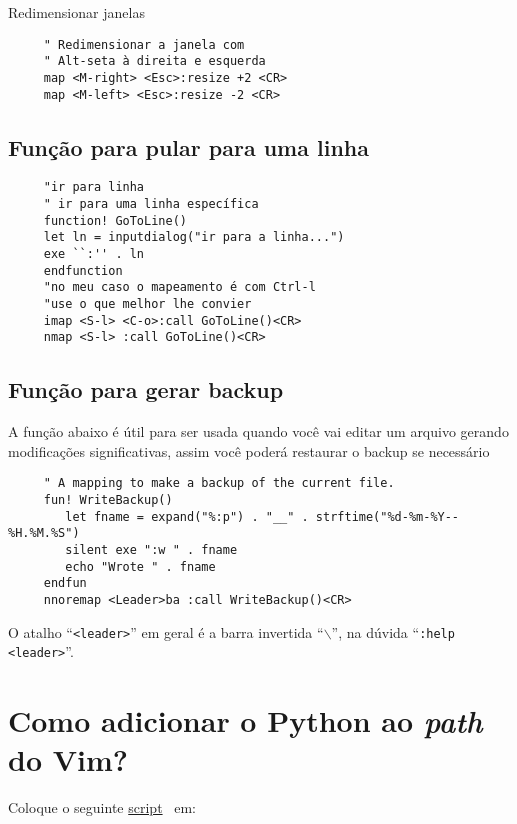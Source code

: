 Redimensionar janelas

\begin{verbatim}
     " Redimensionar a janela com
     " Alt-seta à direita e esquerda
     map <M-right> <Esc>:resize +2 <CR>
     map <M-left> <Esc>:resize -2 <CR>
\end{verbatim}

\subsection{Função para pular para uma linha}
\label{Função para pular para uma linha}

\begin{verbatim}
     "ir para linha
     " ir para uma linha específica
     function! GoToLine()
     let ln = inputdialog("ir para a linha...")
     exe ``:'' . ln
     endfunction
     "no meu caso o mapeamento é com Ctrl-l
     "use o que melhor lhe convier
     imap <S-l> <C-o>:call GoToLine()<CR>
     nmap <S-l> :call GoToLine()<CR>
\end{verbatim}

\subsection{Função para gerar backup}
\label{Função para gerar backup}

A função abaixo é útil para ser usada quando você vai editar um arquivo
gerando modificações significativas, assim você poderá restaurar o backup se necessário

\begin{verbatim}
     " A mapping to make a backup of the current file.
     fun! WriteBackup()
        let fname = expand("%:p") . "__" . strftime("%d-%m-%Y--%H.%M.%S")
        silent exe ":w " . fname
        echo "Wrote " . fname
     endfun
     nnoremap <Leader>ba :call WriteBackup()<CR>
\end{verbatim}

{\Large {}} O atalho ``{\tt <leader>}'' em geral é a barra 
invertida ``$\backslash$'', na dúvida ``{\tt :help <leader>}''.

\section{Como adicionar o Python ao {\em path} do Vim?}
\label{Como adicionar o Python ao path do Vim?}

Coloque o seguinte
\href{http://vim.wikia.com/wiki/Automatically\_add\_Python\_paths\_to\_Vim\_path}{script}~\cite{PythonPath}
 em:

